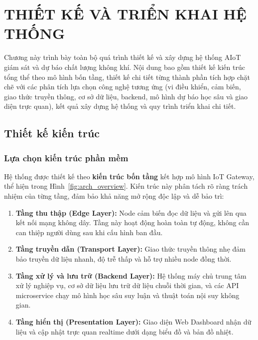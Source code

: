 \chapter{THIẾT KẾ VÀ TRIỂN KHAI HỆ THỐNG}
\label{chap:design}

Chương này trình bày toàn bộ quá trình thiết kế và xây dựng hệ thống
AIoT giám sát và dự báo chất lượng không khí. Nội dung bao gồm thiết
kế kiến trúc tổng thể theo mô hình bốn tầng, thiết kế chi tiết từng
thành phần tích hợp chặt chẽ với các phân tích lựa chọn công nghệ tương ứng (vi
điều khiển, cảm biến, giao thức truyền thông, cơ sở dữ liệu, backend, mô hình dự
báo học sâu và giao diện trực quan), kết quả xây dựng hệ thống và quy
trình triển khai chi tiết.

\section{Thiết kế kiến trúc}
\label{sec:design:arch}

\subsection{Lựa chọn kiến trúc phần mềm}
\label{subsec:design:arch:choice}

Hệ thống được thiết kế theo \textbf{kiến trúc bốn tầng} kết hợp mô
hình IoT Gateway, thể hiện trong Hình~\ref{fig:arch_overview}. Kiến
trúc này phân tách rõ ràng trách nhiệm của từng tầng, đảm bảo khả năng
mở rộng độc lập và dễ bảo trì:

\begin{enumerate}[leftmargin=2cm]
  \item \textbf{Tầng thu thập (Edge Layer):} Node cảm biến đọc dữ liệu và gửi lên qua kết nối mạng không dây. Tầng này hoạt động hoàn toàn tự động, không cần can thiệp người dùng sau khi cấu hình ban đầu.
  \item \textbf{Tầng truyền dẫn (Transport Layer):} Giao thức truyền thông nhẹ đảm bảo truyền dữ liệu nhanh, độ trễ thấp và hỗ trợ nhiều node đồng thời.
  \item \textbf{Tầng xử lý và lưu trữ (Backend Layer):} Hệ thống máy chủ trung tâm xử lý nghiệp vụ, cơ sở dữ liệu lưu trữ dữ liệu chuỗi thời gian, và các API microservice chạy mô hình học sâu suy luận và thuật toán nội suy không gian.
  \item \textbf{Tầng hiển thị (Presentation Layer):} Giao diện Web Dashboard nhận dữ liệu và cập nhật trực quan realtime dưới dạng biểu đồ và bản đồ nhiệt.
\end{enumerate}

